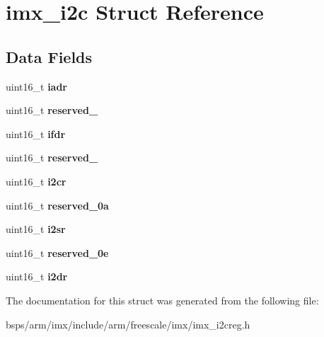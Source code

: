 \hypertarget{structimx__i2c}{}\section{imx\+\_\+i2c Struct Reference}
\label{structimx__i2c}
\subsection*{Data Fields}
\begin{DoxyCompactItemize}
\item 
\mbox{\label{structimx__i2c_a818305fb0f698aae98f815d3fa281951}} 
uint16\+\_\+t {\bfseries iadr}
\item 
\mbox{\label{structimx__i2c_a2f949cf1b066322462576e95043f0d4f}} 
uint16\+\_\+t {\bfseries reserved\+\_}
\item 
\mbox{\label{structimx__i2c_aaa32803f3c4efa4924bb07b5204dfd94}} 
uint16\+\_\+t {\bfseries ifdr}
\item 
\mbox{\label{structimx__i2c_acfa8360d4304d88e8b79d38b9bc99972}} 
uint16\+\_\+t {\bfseries reserved\+\_}
\item 
\mbox{\label{structimx__i2c_ac027d2dd6aad6ebcdc43693eb2c3cf5a}} 
uint16\+\_\+t {\bfseries i2cr}
\item 
\mbox{\label{structimx__i2c_af7a8ccae17d4d5e8718c15a9984c2177}} 
uint16\+\_\+t {\bfseries reserved\+\_\+0a}
\item 
\mbox{\label{structimx__i2c_acf3061407ddda855aa663363ff41e6c8}} 
uint16\+\_\+t {\bfseries i2sr}
\item 
\mbox{\label{structimx__i2c_a7d93e8d42acd5f5d88b407ba8ad1820b}} 
uint16\+\_\+t {\bfseries reserved\+\_\+0e}
\item 
\mbox{\label{structimx__i2c_a85d6f17c29d98283769f7ffb1f4649f7}} 
uint16\+\_\+t {\bfseries i2dr}
\end{DoxyCompactItemize}


The documentation for this struct was generated from the following file\+:\begin{DoxyCompactItemize}
\item 
bsps/arm/imx/include/arm/freescale/imx/imx\+\_\+i2creg.\+h\end{DoxyCompactItemize}
